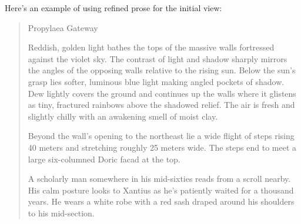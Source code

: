 \normalmarginpar
{}

Here's an example of using refined prose for the initial view:

\begin{quote}
\small{
Propylaea Gateway

Reddish, golden light bathes the tops of the massive walls fortressed against the violet sky.  The contrast of light and shadow sharply mirrors
the angles of the opposing walls relative to the rising sun.  Below the sun's grasp lies softer, luminous blue light making angled pockets of
shadow.  Dew lightly covers the ground and continues up the walls where it glistens as tiny, fractured rainbows above the shadowed relief.  The
air is fresh and slightly chilly with an awakening smell of moist clay.

Beyond the wall's opening to the northeast lie a wide flight of steps rising 40 meters and stretching roughly 25 meters wide.  The steps end to
meet a large six-columned Doric facad at the top.

A scholarly man somewhere in his mid-sixties reads from a scroll nearby.  His calm posture looks to Xantius as he's patiently waited for a
thousand years.  He wears a white robe with a red sash draped around his
shoulders to his mid-section.
} %
\end{quote}

